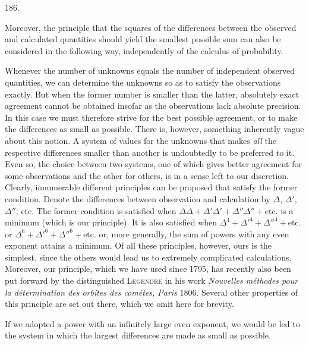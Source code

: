 \begin{center}\hypertarget{native-259-article186}{}186.\end{center}
Moreover, the principle that the squares of the differences between the observed and calculated quantities should yield the smallest possible sum can also be considered in the following way, independently of the calculus of probability.

Whenever the number of unknowns equals the number of independent observed quantities, we can determine the unknowns so as to satisfy the observations exactly. But when the former number is smaller than the latter, absolutely exact agreement cannot be obtained insofar as the observations lack absolute precision. In this case we must therefore strive for the best possible agreement, or to make the differences as small as possible. There is, however, something inherently vague about this notion. A system of values for the unknowns that makes \emph{all} the respective differences smaller than another is undoubtedly to be preferred to it. Even so, the choice between two systems, one of which gives better agreement for some observations and the other for others, is in a sense left to our discretion. Clearly, innumerable different principles can be proposed that satisfy the former condition. Denote the differences between observation and calculation by $\Delta$, $\Delta'$, $\Delta''$, etc. The former condition is satisfied when $\Delta\Delta+\Delta'\Delta'+\Delta''\Delta''+\text{etc.}$ is a minimum (which is our principle). It is also satisfied when $\Delta^4+\Delta'^4+\Delta''^4+\text{etc.}$ or $\Delta^6+\Delta'^6+\Delta''^6+\text{etc.}$ or, more generally, the sum of powers with any even exponent attains a minimum. Of all these principles, however, ours is the simplest, since the others would lead us to extremely complicated calculations. Moreover, our principle, which we have used since 1795, has recently also been put forward by the distinguished \textsc{Legendre} in his work \emph{Nouvelles méthodes pour la
détermination des orbites des comètes, Paris} 1806. Several other properties of this principle are set out there, which we omit here for brevity.

If we adopted a power with an infinitely large even exponent, we would be led to the system in which the largest differences are made as small as possible.

